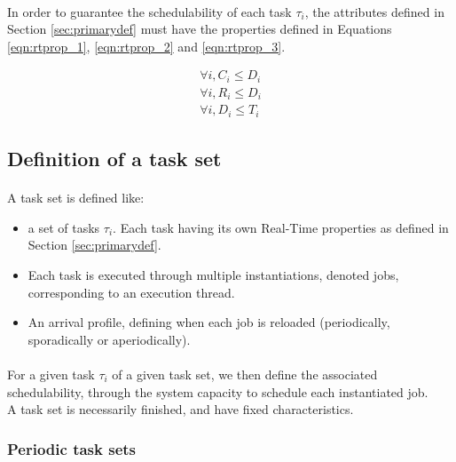 \paragraph{}
In order to guarantee the schedulability of each task $\tau_{i}$, the attributes defined in Section
\ref{sec:primarydef} must have the properties defined in Equations \ref{eqn:rtprop_1},
\ref{eqn:rtprop_2} and \ref{eqn:rtprop_3}.

\begin{eqnarray}
\label{eqn:rtprop_1}
\forall i, C_{i} \le D_{i}\\
\label{eqn:rtprop_2}
\forall i, R_{i} \le D_{i}\\
\label{eqn:rtprop_3}
\forall i, D_{i} \le T_{i}
\end{eqnarray}

\subsection{Definition of a task set}

\paragraph{}
A task set is defined like:
\begin{itemize}
\item a set of tasks $\tau_i$. Each task having its own Real-Time properties as defined in Section
\ref{sec:primarydef}.
\item Each task is executed through multiple instantiations, denoted jobs, corresponding to an
execution thread.
\item An arrival profile, defining when each job is reloaded (periodically, sporadically or
aperiodically).
\end{itemize}

\paragraph{}
For a given task $\tau_{i}$ of a given task set, we then define the associated schedulability,
through the system capacity to schedule each instantiated job.\\
A task set is necessarily finished, and have fixed characteristics.

\subsubsection{Periodic task sets}

